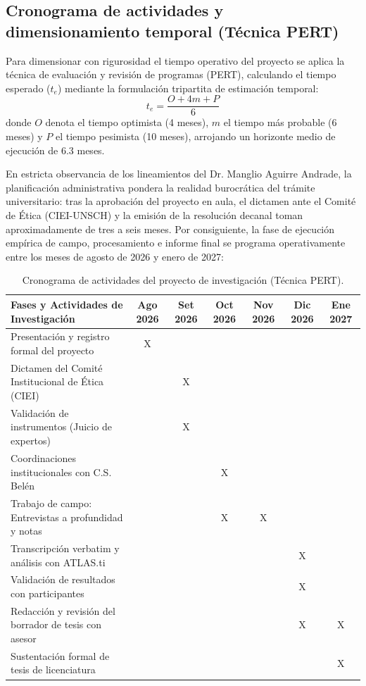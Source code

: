 \subsection{Cronograma de actividades y dimensionamiento temporal (Técnica PERT)}
\label{sec:5.4_cronograma}
Para dimensionar con rigurosidad el tiempo operativo del proyecto se aplica la técnica de evaluación y revisión de programas (PERT), calculando el tiempo esperado ($t_e$) mediante la formulación tripartita de estimación temporal:
\begin{equation}
\label{eq:pert_tiempo}
t_e = \frac{O + 4m + P}{6}
\end{equation}
donde $O$ denota el tiempo optimista (4 meses), $m$ el tiempo más probable (6 meses) y $P$ el tiempo pesimista (10 meses), arrojando un horizonte medio de ejecución de 6.3 meses. 

En estricta observancia de los lineamientos del Dr. Manglio Aguirre Andrade, la planificación administrativa pondera la realidad burocrática del trámite universitario: tras la aprobación del proyecto en aula, el dictamen ante el Comité de Ética (CIEI-UNSCH) y la emisión de la resolución decanal toman aproximadamente de tres a seis meses. Por consiguiente, la fase de ejecución empírica de campo, procesamiento e informe final se programa operativamente entre los meses de agosto de 2026 y enero de 2027:

\begin{table}[H]
\centering
\small
\begin{tabularx}{\textwidth}{Xcccccc}
\toprule
\textbf{Fases y Actividades de Investigación} & \textbf{Ago 2026} & \textbf{Set 2026} & \textbf{Oct 2026} & \textbf{Nov 2026} & \textbf{Dic 2026} & \textbf{Ene 2027} \\
\midrule
Presentación y registro formal del proyecto & X & & & & & \\
Dictamen del Comité Institucional de Ética (CIEI) & & X & & & & \\
Validación de instrumentos (Juicio de expertos) & & X & & & & \\
Coordinaciones institucionales con C.S. Belén & & & X & & & \\
Trabajo de campo: Entrevistas a profundidad y notas & & & X & X & & \\
Transcripción verbatim y análisis con ATLAS.ti & & & & & X & \\
Validación de resultados con participantes & & & & & X & \\
Redacción y revisión del borrador de tesis con asesor & & & & & X & X \\
Sustentación formal de tesis de licenciatura & & & & & & X \\
\bottomrule
\end{tabularx}
\caption{Cronograma de actividades del proyecto de investigación (Técnica PERT).}
\label{tab:cronograma}
\end{table}

